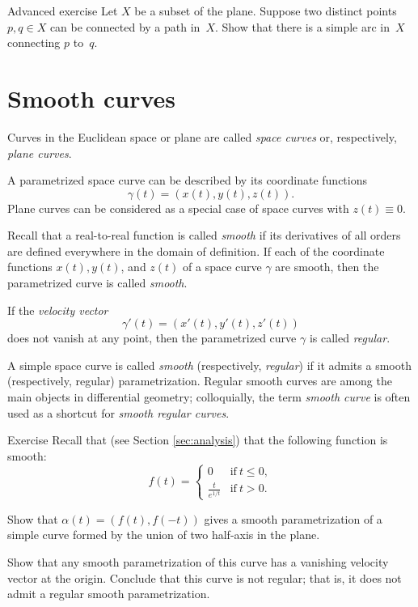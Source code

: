 \begin{thm}{Advanced exercise}\label{aex:simple-curve}
Let $X$ be a subset of the plane.
Suppose two distinct points $p,q\in X$ can be connected by a path in~$X$.
Show that there is a simple arc in~$X$ connecting $p$ to~$q$.
\end{thm}

\section{Smooth curves}

Curves in the Euclidean space or plane are called \emph{space curves} or, respectively, \emph{plane curves}.

A parametrized space curve can be described by its coordinate functions 
\[\gamma(t)=(x(t),y(t),z(t)).\]
Plane curves can be considered as a special case of space curves with $z(t)\equiv 0$.

Recall that a real-to-real function is called \emph{smooth} if its derivatives of all orders are defined everywhere in the domain of definition.  
If each of the coordinate functions $x(t), y(t)$, and $z(t)$ of a space curve $\gamma$ are smooth, then the parametrized curve is called \emph{smooth}.

If the \emph{velocity vector} 
\[\gamma'(t)=(x'(t),y'(t),z'(t))\] 
does not vanish at any point, then the parametrized curve $\gamma$ is called \emph{regular}.\label{page:regular curve}

A simple space curve is called \emph{smooth} (respectively, {}\emph{regular}) if it admits a smooth (respectively, regular) parametrization.
Regular smooth curves are among the main objects in differential geometry;
colloquially, the term \emph{smooth curve} is often used as a shortcut for {}\emph{smooth regular curves}. 

\begin{thm}{Exercise}\label{ex:L-shape}
Recall that (see Section \ref{sec:analysis}) that the following function is smooth: 
\[f(t)=
\begin{cases}
0&\text{if}\ t\le 0,
\\
\frac{t}{e^{1\!/\!t}}&\text{if}\ t> 0.
\end{cases}
\]

Show that $\alpha(t)=(f(t),f(-t))$ gives a smooth parametrization of a simple curve formed by the union of two half-axis in the plane.

Show that any smooth parametrization of this curve has a vanishing velocity vector at the origin.
Conclude that this curve is not regular;
that is, it does not admit a regular smooth parametrization.
\end{thm}


